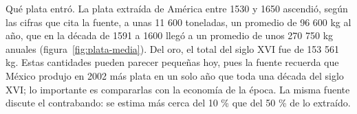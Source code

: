 \documentclass{book}
\begin{document}

Qué plata entró. La plata extraída de América entre 1530 y 1650 ascendió, según las cifras que cita la fuente, a unas 11 600 toneladas, un promedio de 96 600 kg al año, que en la década de 1591 a 1600 llegó a un promedio de unos 270 750 kg anuales (figura~\ref{fig:plata-media}). Del oro, el total del siglo XVI fue de 153 561 kg. Estas cantidades pueden parecer pequeñas hoy, pues la fuente recuerda que México produjo en 2002 más plata en un solo año que toda una década del siglo XVI; lo importante es compararlas con la economía de la época. La misma fuente discute el contrabando: se estima más cerca del 10 \% que del 50 \% de lo extraído.

\end{document}
